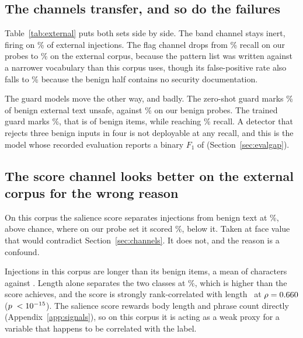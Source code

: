 \documentclass[conference]{IEEEtran}
\begin{document}
\subsection{The channels transfer, and so do the failures}

Table~\ref{tab:external} puts both sets side by side. The band channel stays
inert, firing on \ExtBandTpr{}\% of external injections. The flag channel drops
from \FlagTprAttack{}\% recall on our probes to \ExtFlagTpr{}\% on the
external corpus, because
the pattern list was written against a narrower vocabulary than this corpus
uses, though its false-positive rate also falls to \ExtFlagFpr{}\% because the
benign half contains no security documentation.

The guard models move the other way, and badly. The zero-shot guard marks
\ExtBinFprZs{}\% of benign external text unsafe, against \BinFprZs{}\% on our
benign probes. The trained guard marks \ExtBinFprTr{}\%, that is
\NExtBinFpTr{} of \NExtBenign{} benign items, while reaching
\ExtBinTprTr{}\% recall. A detector that rejects three benign inputs in four is
not deployable at any recall, and this is the model whose recorded evaluation
reports a binary $F_1$ of \ReportedFOneTr{} (Section~\ref{sec:evalgap}).

\begin{table}[t]
\centering
\caption{Channel rates on our probe set and on the external corpus. The trained
guard row is an optimistic bound, since part of its training data came from
this corpus.}
\label{tab:external}
\footnotesize

\end{table}

\subsection{The score channel looks better on the external corpus for the
wrong reason}
\label{sec:confound}

On this corpus the salience score separates injections from benign text at
\ExtAurocScore{}\%, above chance, where on our probe set it scored
\AurocScoreAttack{}\%, below it. Taken at face value that would contradict
Section~\ref{sec:channels}. It does not, and the reason is a confound.

Injections in this corpus are longer than its benign items, a mean of
\ExtMeanLenInjection{} characters against \ExtMeanLenBenign{}. Length alone
separates the two classes at \ExtAurocLength{}\%, which is higher than the
score achieves, and the score is strongly rank-correlated with
length~\cite{spearman1904} at $\rho=0.660{}$
($p\;<10^{-15}{}$). The salience score rewards body length and phrase
count directly (Appendix~\ref{app:signals}), so on this corpus it is acting as
a weak proxy for a variable that happens to be correlated with the label.
\end{document}
